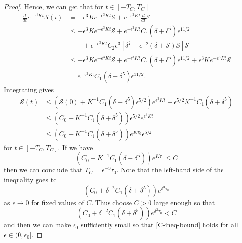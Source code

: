 \begin{proof}
	Hence, we can get that for \(t \in [-T_{C}, T_{C}]\) 
	\begin{equation}
		\begin{aligned}
			\frac d {dt} e^{-\epsilon^3 K t} \mathcal S(t) &= - \epsilon^3 K e^{-\epsilon^3 K t} \mathcal S  + e^{-\epsilon^3 K t} \frac d {dt} \mathcal S \\
			&\leq - \epsilon^3 K e^{-\epsilon^3 K t} \mathcal S  + e^{-\epsilon^3 K t}C_1(\delta + \delta^5) \epsilon^{11/2} \\
			&\qquad+ e^{-\epsilon^3 K t}C_2 \epsilon^3\left[ \delta^2 + \epsilon^{-2}(\delta + \mathcal S) \mathcal S \right]\mathcal S \\
			&\leq - \epsilon^3 K e^{-\epsilon^3 K t} \mathcal S  +  e^{-\epsilon^3 K t}C_1(\delta + \delta^5) \epsilon^{11/2} + \epsilon^3 K e^{-\epsilon^3 K t}\mathcal S \\
			&= e^{-\epsilon^3 K t}C_1(\delta + \delta^5) \epsilon^{11/2}.
		\end{aligned}
	\end{equation}
	Integrating gives
	\begin{equation} 
		\begin{aligned}
			\mathcal S(t) &\leq \left( \mathcal S(0) + K^{-1} C_1 (\delta+\delta^5) \epsilon^{5/2} \right) e^{\epsilon^3 K t} - \epsilon^{5/2} K^{-1} C_1 (\delta + \delta^5) \\
			&\leq \left(C_0+ K^{-1} C_1 (\delta+\delta^5)  \right) \epsilon^{5/2}e^{\epsilon^3 K t} \\
			&\leq (C_0 + K^{-1} C_1 (\delta+\delta^5) ) e^{K\tau_0} \epsilon^{5/2}
		\end{aligned}
	\end{equation}
	for \(t \in [-T_{C}, T_{C}]\). If we have 
	\begin{equation}\label{C-ineq-bound}
		(C_0 + K^{-1} C_1 (\delta+\delta^5) ) e^{K\tau_0}  \leq C
	\end{equation} 
	then we can conclude that \(T_C = \epsilon^{-3}\tau_0.\) Note that the left-hand side of the inequality goes to 
	\begin{equation}
		(C_0 + \delta^{-2} C_1 (\delta+\delta^5) ) e^{\delta^2\tau_0}
	\end{equation}
	as \(\epsilon \to 0\) for fixed values of \(C\). Thus choose \(C>0\) large enough so that
	\begin{equation}
		(C_0 + \delta^{-2} C_1 (\delta+\delta^5) ) e^{\delta^2\tau_0} < C
	\end{equation}
 	and then we can make \(\epsilon_0\) sufficiently small so that \cref{C-ineq-bound} holds for all \(\epsilon \in (0,\epsilon_0]\).
\end{proof}

